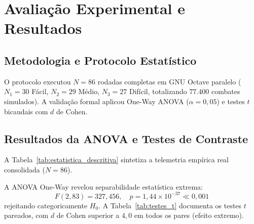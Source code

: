 \documentclass[10pt,conference,twocolumn]{article}
\begin{document}
\section{Avaliação Experimental e Resultados}
\label{sec:resultados}

\subsection{Metodologia e Protocolo Estatístico}
O protocolo executou $N = 86$ rodadas completas em GNU Octave paralelo ($N_1 = 30$ Fácil, $N_2 = 29$ Médio, $N_3 = 27$ Difícil, totalizando $77.400$ combates simulados). A validação formal aplicou One-Way ANOVA ($\alpha = 0{,}05$) e testes $t$ bicaudais com $d$ de Cohen.

\subsection{Resultados da ANOVA e Testes de Contraste}
A Tabela~\ref{tab:estatistica_descritiva} sintetiza a telemetria empírica real consolidada ($N = 86$).

\begin{table}[h]
\centering
\caption{Estatística Descritiva do Fitness Máximo por Dificuldade ($N=86$)}
\label{tab:estatistica_descritiva}
\end{table}

A ANOVA One-Way revelou separabilidade estatística extrema:
\begin{equation}
F(2, 83) = 327{,}456, \quad p = 1{,}44 \times 10^{-37} \ll 0{,}001
\end{equation}
rejeitando categoricamente $H_0$. A Tabela~\ref{tab:testes_t} documenta os testes $t$ pareados, com $d$ de Cohen superior a $4{,}0$ em todos os pares (efeito extremo).
\end{document}
